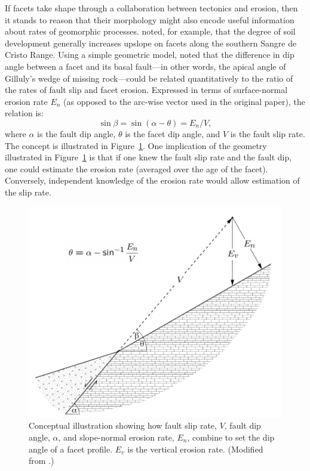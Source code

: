 If facets take shape through a collaboration between tectonics and erosion, then it stands to reason that their morphology might also encode useful information about rates of geomorphic processes. \citet{menges1990soils} noted, for example, that the degree of soil development generally increases upslope on facets along the southern Sangre de Cristo Range. Using a simple geometric model, \citet{tucker2011geomorphic} noted that the difference in dip angle between a facet and its basal fault---in other words, the apical angle of Gilluly's wedge of missing rock---could be related quantitatively to the ratio of the rates of fault slip and facet erosion. Expressed in terms of surface-normal erosion rate $E_n$ (as opposed to the arc-wise vector used in the original paper), the relation is:
\begin{equation}
\sin \beta = \sin ( \alpha - \theta ) = E_n / V,
\label{eq:predangle}
\end{equation}
where $\alpha$ is the fault dip angle, $\theta$ is the facet dip angle, and $V$ is the fault slip rate. The concept is illustrated in Figure~\ref{fig:facetschem}. One implication of the geometry illustrated in Figure~\ref{fig:facetschem} is that if one knew the fault slip rate and the fault dip, one could estimate the erosion rate (averaged over the age of the facet). Conversely, independent knowledge of the erosion rate would allow estimation of the slip rate.

\begin{figure}[ht!]
\centerline{\includegraphics{Figures/facet_schematic.pdf}}
\caption{Conceptual illustration showing how fault slip rate, $V$, fault dip angle, $\alpha$, and slope-normal erosion rate, $E_n$, combine to set the dip angle of a facet profile. $E_v$ is the vertical erosion rate. (Modified from \citet{tucker2011geomorphic}.)} 
\label{fig:facetschem}
\end{figure}

